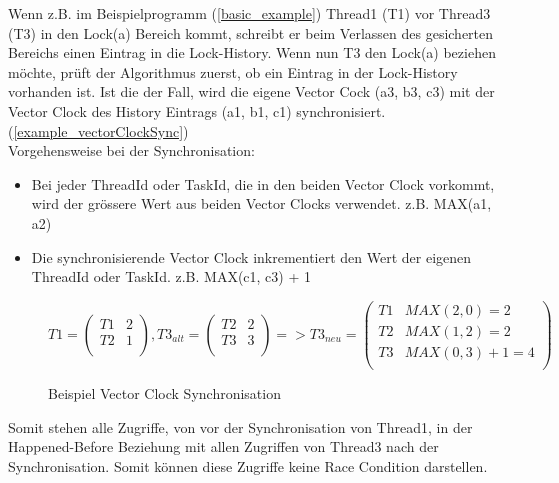 \documentclass[10pt,a4paper]{article}
\begin{document}
\begin{flushleft}
Wenn z.B. im Beispielprogramm (\autoref{basic_example}) Thread1 (T1) vor Thread3 (T3) in den Lock(a) Bereich kommt, schreibt er beim Verlassen des gesicherten Bereichs einen Eintrag in die Lock-History. Wenn nun T3 den Lock(a) beziehen möchte, prüft der Algorithmus zuerst, ob ein Eintrag in der Lock-History vorhanden ist. Ist die der Fall, wird die eigene Vector Cock (a3, b3, c3) mit der Vector Clock des History Eintrags (a1, b1, c1) synchronisiert. (\autoref{example_vectorClockSync})\\
\newpage
Vorgehensweise bei der Synchronisation:
\begin{itemize}
\item Bei jeder ThreadId oder TaskId, die in den beiden Vector Clock vorkommt, wird der grössere Wert aus beiden Vector Clocks verwendet. z.B. MAX(a1, a2)
\item Die synchronisierende Vector Clock inkrementiert den Wert der eigenen ThreadId oder TaskId. z.B. MAX(c1, c3) + 1
\end{itemize}
\begin{figure}[H]
\[
	T1 = \begin{pmatrix}
		T1 & 2\\
		T2 & 1\\
	\end{pmatrix},
	T3_{alt} = \begin{pmatrix}
		T2 & 2\\
		T3 & 3\\
	\end{pmatrix} =>
	T3_{neu} = \begin{pmatrix}
		T1 & MAX(2, 0) = 2\\
		T2 & MAX(1, 2) = 2\\
		T3 & MAX(0, 3) + 1 = 4\\
	\end{pmatrix}
\]
\caption{Beispiel Vector Clock Synchronisation}\label{example_vectorClockSync}
\end{figure}
Somit stehen alle Zugriffe, von vor der Synchronisation von Thread1, in der Happened-Before Beziehung mit allen Zugriffen von Thread3 nach der Synchronisation. Somit können diese Zugriffe keine Race Condition darstellen.
\end{flushleft}
\end{document}

